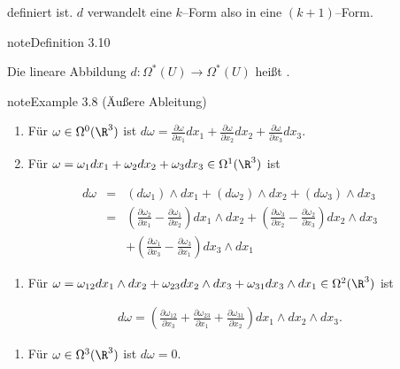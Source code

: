 \documentclass[letterpaper,10pt,english]{jupyterBook}
\begin{document}
\sphinxAtStartPar
definiert ist. \(d\) verwandelt eine \(k\)–Form also in eine \((k+1)\)–Form.
\label{vektoranalysis/diffformen:aeussere Ableitung}
\begin{sphinxadmonition}{note}{Definition 3.10}



\sphinxAtStartPar
Die lineare Abbildung \(d:\Omega^*(U)\to\Omega^*(U)\) heißt .
\end{sphinxadmonition}
\label{vektoranalysis/diffformen:ex:10.14}
\begin{sphinxadmonition}{note}{Example 3.8 (Äußere Ableitung)}


\begin{enumerate}
%
\item {} 
\sphinxAtStartPar
Für \(\omega\in\Omega^0(\R^3)\) ist \(d\omega = \frac{\partial\omega}{\partial x_1}dx_1+
\frac{\partial\omega}{\partial x_2}dx_2+\frac{\partial\omega}{\partial x_3}dx_3\).

\item {} 
\sphinxAtStartPar
Für \(\omega = \omega_1dx_1+\omega_2dx_2+\omega_3dx_3\in\Omega^1(\R^3)\) ist

\end{enumerate}
\begin{equation*}
\begin{split}d\omega &=& (d\omega_1)\wedge dx_1+(d\omega_2)\wedge dx_2+(d\omega_3)\wedge
dx_3\\
&=& \left(\frac{\partial\omega_2}{\partial x_1}-\frac{\partial\omega_1}{\partial x_2}\right)
dx_1\wedge dx_2+ \left(\frac{\partial\omega_3}{\partial x_2}-\frac{\partial\omega_2}{\partial x_3}\right)
dx_2\wedge dx_3\\
&& + \left(\frac{\partial\omega_1}{\partial x_3}-\frac{\partial\omega_3}{\partial x_1}\right)
dx_3\wedge dx_1\end{split}
\end{equation*}\begin{enumerate}
%
\item {} 
\sphinxAtStartPar
Für \(\omega = \omega_{12}dx_1\wedge dx_2+\omega_{23}dx_2\wedge dx_3
+\omega_{31}dx_3\wedge dx_1 \in\Omega^2(\R^3)\) ist

\end{enumerate}
\begin{equation*}
\begin{split}d\omega = \left(\frac{\partial\omega_{12}}{\partial x_3} + \frac{\partial\omega_{23}}{\partial x_1}
+ \frac{\partial\omega_{31}}{\partial x_2}\right)dx_1\wedge dx_2\wedge dx_3.\end{split}
\end{equation*}\begin{enumerate}
%
\item {} 
\sphinxAtStartPar
Für \(\omega\in\Omega^3(\R^3)\) ist \(d\omega=0\).

\end{enumerate}
\end{sphinxadmonition}
\end{document}
